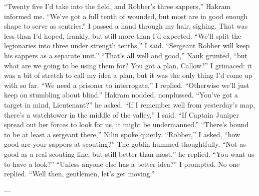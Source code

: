 \documentclass[12pt, openany]{book}
\begin{document}
“Twenty five I’d take into the field, and Robber’s three sappers,” Hakram informed me. “We’ve got a full tenth of wounded, but most are in good enough shape to serve as sentries.”
I passed a hand through my hair, sighing. That was less than I’d hoped, frankly, but still more than I’d expected.
“We’ll split the legionaries into three under strength tenths,” I said. “Sergeant Robber will keep his sappers as a separate unit.”
“That’s all well and good,” Nauk grunted, “but what are we going to be using them for? You got a plan, Callow?”
I grimaced: it was a bit of stretch to call my idea a plan, but it was the only thing I’d come up with so far.
“We need a prisoner to interrogate,” I replied. “Otherwise we’ll just keep on stumbling about blind.”
Hakram nodded, nonplussed.
“You’ve got a target in mind, Lieutenant?” he asked.
“If I remember well from yesterday’s map, there’s a watchtower in the middle of the valley,” I said. “If Captain Juniper spread out her forces to look for us, it might be undermanned.”
“There’s bound to be at least a sergeant there,” Nilin spoke quietly.
“Robber,” I asked, “how good are your sappers at scouting?”
The goblin hummed thoughtfully.
“Not as good as a real scouting line, but still better than most,” he replied. “You want us to have a look?”
“Unless anyone else has a better idea?” I prompted. No one replied. “Well then, gentlemen, let’s get moving.”

—
\end{document}
